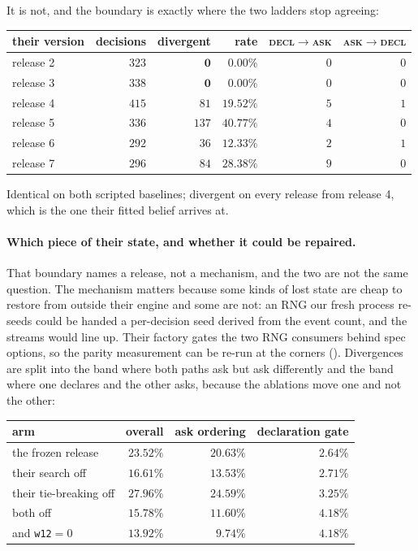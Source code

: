 \documentclass[11pt,letterpaper]{article}
\begin{document}
It is not, and the boundary is exactly where the two ladders stop agreeing:

\begin{center}
\small
\begin{tabular}{lrrrrr}
\toprule
their version & decisions & divergent & rate & \textsc{decl}$\to$\textsc{ask} & \textsc{ask}$\to$\textsc{decl} \\
\midrule
release 2 & $323$ & $\mathbf{0}$ & $0.00\%$ & $0$ & $0$ \\
release 3 & $338$ & $\mathbf{0}$ & $0.00\%$ & $0$ & $0$ \\
release 4 & $415$ & $81$ & $19.52\%$ & $5$ & $1$ \\
release 5 & $336$ & $137$ & $40.77\%$ & $4$ & $0$ \\
release 6 & $292$ & $36$ & $12.33\%$ & $2$ & $1$ \\
release 7 & $296$ & $84$ & $28.38\%$ & $9$ & $0$ \\
\bottomrule
\end{tabular}
\end{center}

\noindent Identical on both scripted baselines; divergent on every release from
release 4, which is the one their fitted belief arrives at.

\paragraph{Which piece of their state, and whether it could be repaired.} That
boundary names a release, not a mechanism, and the two are not the same
question. The mechanism matters because some kinds of lost state are cheap to
restore from outside their engine and some are not: an RNG our fresh process
re-seeds could be handed a per-decision seed derived from the event count, and
the streams would line up. Their factory gates the two RNG consumers behind
spec options, so the parity measurement can be re-run at the corners
(). Divergences are split into the
band where both paths ask but ask differently and the band where one declares
and the other asks, because the ablations move one and not the other:

\begin{center}
\small
\begin{tabular}{lrrr}
\toprule
arm & overall & ask ordering & declaration gate \\
\midrule
the frozen release            & $23.52\%$ & $20.63\%$ & $2.64\%$ \\
their search off              & $16.61\%$ & $13.53\%$ & $2.71\%$ \\
their tie-breaking off        & $27.96\%$ & $24.59\%$ & $3.25\%$ \\
both off                      & $15.78\%$ & $11.60\%$ & $4.18\%$ \\
\quad and \texttt{w12}${=}0$  & $\mathbf{13.92\%}$ & $9.74\%$ & $4.18\%$ \\
\bottomrule
\end{tabular}
\end{center}
\end{document}
